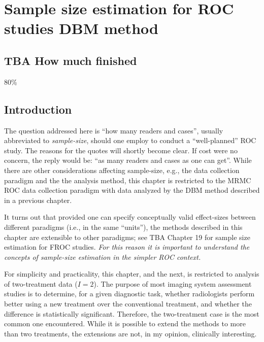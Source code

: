 \documentclass[
]{book}
\begin{document}
\hypertarget{roc-sample-size-dbm}{%
\chapter{Sample size estimation for ROC studies DBM method}\label{roc-sample-size-dbm}}

\hypertarget{roc-sample-size-dbm-how-much-finished}{%
\section{TBA How much finished}\label{roc-sample-size-dbm-how-much-finished}}

80\%

\hypertarget{roc-sample-size-dbm-introduction}{%
\section{Introduction}\label{roc-sample-size-dbm-introduction}}

The question addressed here is ``how many readers and cases'', usually abbreviated to \emph{sample-size}, should one employ to conduct a ``well-planned'' ROC study. The reasons for the quotes will shortly become clear. If cost were no concern, the reply would be: ``as many readers and cases as one can get''. While there are other considerations affecting sample-size, e.g., the data collection paradigm and the the analysis method, this chapter is restricted to the MRMC ROC data collection paradigm with data analyzed by the DBM method described in a previous chapter.

It turns out that provided one can specify conceptually valid effect-sizes between different paradigms (i.e., in the same ``units''), the methods described in this chapter are extensible to other paradigms; see TBA Chapter 19 for sample size estimation for FROC studies. \emph{For this reason it is important to understand the concepts of sample-size estimation in the simpler ROC context.}

For simplicity and practicality, this chapter, and the next, is restricted to analysis of two-treatment data (\(I = 2\)). The purpose of most imaging system assessment studies is to determine, for a given diagnostic task, whether radiologists perform better using a new treatment over the conventional treatment, and whether the difference is statistically significant. Therefore, the two-treatment case is the most common one encountered. While it is possible to extend the methods to more than two treatments, the extensions are not, in my opinion, clinically interesting.
\end{document}
